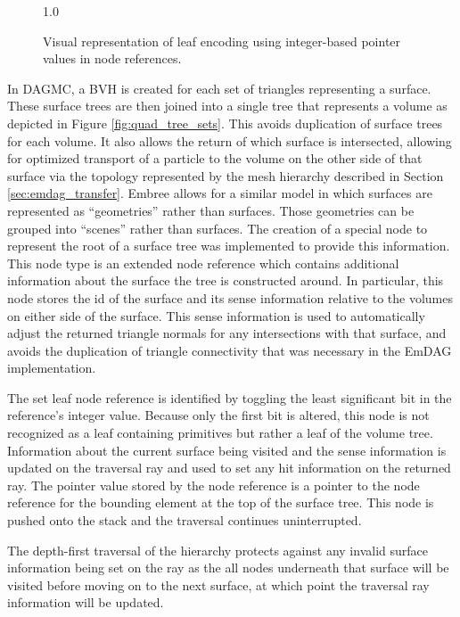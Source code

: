 \begin{figure}[H]
  \centering
  {1.0\textwidth}
  \caption{Visual representation of leaf encoding using integer-based
    pointer values in node references.}
  \label{fig:leaf_encoding}
\end{figure}

In DAGMC, a BVH is created for each set of triangles representing a
surface. These surface trees are then joined into a single tree that represents
a volume as depicted in Figure \ref{fig:quad_tree_sets}. This avoids duplication
of surface trees for each volume. It also allows the return of which surface is
intersected, allowing for optimized transport of a particle to the volume on the
other side of that surface via the topology represented by the mesh hierarchy
described in Section \ref{sec:emdag_transfer}. Embree allows for a similar model
in which surfaces are represented as ``geometries'' rather than surfaces. Those
geometries can be grouped into ``scenes'' rather than surfaces.  The creation of
a special node to represent the root of a surface tree was implemented to
provide this information. This node type is an extended node reference which
contains additional information about the surface the tree is constructed
around. In particular, this node stores the id of the surface and its sense
information relative to the volumes on either side of the surface. This sense
information is used to automatically adjust the returned triangle normals for
any intersections with that surface, and avoids the duplication of triangle
connectivity that was necessary in the EmDAG implementation.

The set leaf node reference is identified by toggling the least significant bit in
the reference's integer value. Because only the first bit is altered, this node
is not recognized as a leaf containing primitives but rather a leaf of the
volume tree. Information about the current surface being visited and the sense
information is updated on the traversal ray and used to set any hit information
on the returned ray. The pointer value stored by the node reference is a pointer
to the node reference for the bounding element at the top of the
surface tree. This node is pushed onto the stack and the traversal continues
uninterrupted.

The depth-first traversal of the hierarchy protects against
any invalid surface information being set on the ray as the all nodes underneath
that surface will be visited before moving on to the next surface, at which
point the traversal ray information will be updated.

